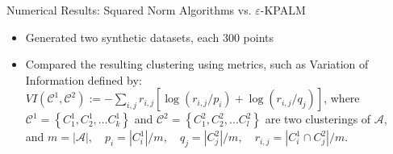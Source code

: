 \documentclass[9pt,handout]{beamer} %
\begin{document}
	\begin{frame}{Numerical Results: Squared Norm Algorithms vs. $\varepsilon$-KPALM}
		\begin{itemize}[<+->]
			\item Generated two synthetic datasets, each 300 points
			\begin{figure}
		    	\centering
			\end{figure}
			\setcounter{subfigure}{0}
			\item Compared the resulting clustering using metrics, such as {\dblue Variation of Information} defined by:
				$VI(\mathcal{C}^1,\mathcal{C}^2):=-\sum\limits_{i,j} r_{i,j}\left[ \log \left( r_{i,j}/p_i \right) + \log \left( r_{i,j}/q_j \right) \right]$, where $\mathcal{C}^1=\left\lbrace C^1_1, C^1_2, \ldots C^1_k \right\rbrace$ and $\mathcal{C}^2=\left\lbrace C^2_1, C^2_2, \ldots C^2_l \right\rbrace$ are two clusterings of $\mathcal{A}$,\\ and $m=|\mathcal{A}|, \quad p_i=|C^1_i|/m,\quad q_j=|C^2_j|/m, \quad r_{i,j}= |C^1_i \cap C^2_j|/m$.
		\end{itemize}
	\end{frame}
	
\end{document}
